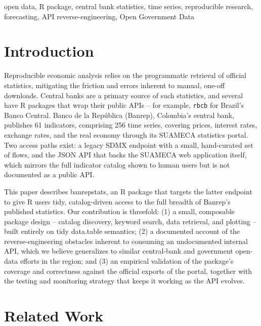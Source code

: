 \documentclass[conference]{IEEEtran}
\begin{document}
\begin{IEEEkeywords}
open data, R package, central bank statistics, time series, reproducible research, forecasting, API reverse-engineering, Open Government Data
\end{IEEEkeywords}

\section{Introduction}

Reproducible economic analysis relies on the programmatic retrieval of official statistics, mitigating the friction and errors inherent to manual, one-off downloads. Central banks are a primary source of such statistics, and several have R packages that wrap their public APIs -- for example, \texttt{rbcb} for Brazil's Banco Central. Banco de la Rep\'ublica (Banrep), Colombia's central bank, publishes 61 indicators, comprising 256 time series, covering prices, interest rates, exchange rates, and the real economy through its SUAMECA statistics portal. Two access paths exist: a legacy SDMX endpoint with a small, hand-curated set of flows, and the JSON API that backs the SUAMECA web application itself, which mirrors the full indicator catalog shown to human users but is not documented as a public API.

This paper describes banrepstats, an R package that targets the latter
endpoint to give R users tidy, catalog-driven access to the full breadth
of Banrep's published statistics. Our contribution is threefold: (1) a
small, composable package design -- catalog discovery, keyword search,
data retrieval, and plotting -- built entirely on tidy data.table
semantics; (2) a documented account of the reverse-engineering
obstacles inherent to consuming an undocumented internal API, which we
believe generalizes to similar central-bank and government open-data
efforts in the region; and (3) an empirical validation of the package's
coverage and correctness against the official exports of the portal,
together with the testing and monitoring strategy that keeps it working
as the API evolves.

\section{Related Work}
\end{document}
